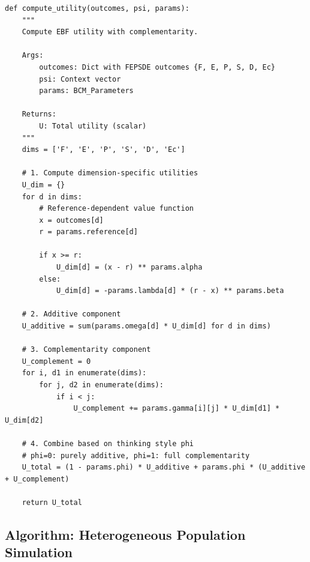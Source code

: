 \begin{tcolorbox}[colback=gray!5!white, colframe=gray!75!black,
    title=Implementation AZ-S2: EBF Utility Function]
\begin{verbatim}
def compute_utility(outcomes, psi, params):
    """
    Compute EBF utility with complementarity.

    Args:
        outcomes: Dict with FEPSDE outcomes {F, E, P, S, D, Ec}
        psi: Context vector
        params: BCM_Parameters

    Returns:
        U: Total utility (scalar)
    """
    dims = ['F', 'E', 'P', 'S', 'D', 'Ec']

    # 1. Compute dimension-specific utilities
    U_dim = {}
    for d in dims:
        # Reference-dependent value function
        x = outcomes[d]
        r = params.reference[d]

        if x >= r:
            U_dim[d] = (x - r) ** params.alpha
        else:
            U_dim[d] = -params.lambda[d] * (r - x) ** params.beta

    # 2. Additive component
    U_additive = sum(params.omega[d] * U_dim[d] for d in dims)

    # 3. Complementarity component
    U_complement = 0
    for i, d1 in enumerate(dims):
        for j, d2 in enumerate(dims):
            if i < j:
                U_complement += params.gamma[i][j] * U_dim[d1] * U_dim[d2]

    # 4. Combine based on thinking style phi
    # phi=0: purely additive, phi=1: full complementarity
    U_total = (1 - params.phi) * U_additive + params.phi * (U_additive + U_complement)

    return U_total
\end{verbatim}
\end{tcolorbox}

\subsection{Algorithm: Heterogeneous Population Simulation}

